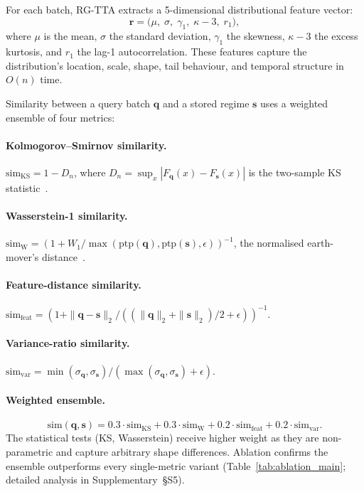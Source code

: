 \documentclass[journal]{IEEEtran}
\begin{document}
For each batch, RG-TTA extracts a 5-dimensional distributional feature vector:
\begin{equation}
  \mathbf{r} = \big(\mu,\; \sigma,\; \gamma_1,\; \kappa{-}3,\; r_1\big),
  \label{eq:features}
\end{equation}
where $\mu$ is the mean, $\sigma$ the standard deviation, $\gamma_1$ the skewness, $\kappa{-}3$ the excess kurtosis, and $r_1$ the lag-1 autocorrelation. These features capture the distribution's location, scale, shape, tail behaviour, and temporal structure in $O(n)$ time.

Similarity between a query batch $\mathbf{q}$ and a stored regime $\mathbf{s}$ uses a weighted ensemble of four metrics:

\paragraph{Kolmogorov--Smirnov similarity.} $\text{sim}_{\text{KS}} = 1 - D_n$, where $D_n = \sup_x |F_{\mathbf{q}}(x) - F_{\mathbf{s}}(x)|$ is the two-sample KS statistic~\cite{massey1951ks}.

\paragraph{Wasserstein-1 similarity.} $\text{sim}_{\text{W}} = (1 + W_1 / \max(\text{ptp}(\mathbf{q}), \text{ptp}(\mathbf{s}), \epsilon))^{-1}$, the normalised earth-mover's distance~\cite{villani2009optimal}.

\paragraph{Feature-distance similarity.} $\text{sim}_{\text{feat}} = (1 + \|\mathbf{q} - \mathbf{s}\|_2 / ((\|\mathbf{q}\|_2 + \|\mathbf{s}\|_2)/2 + \epsilon))^{-1}$.

\paragraph{Variance-ratio similarity.} $\text{sim}_{\text{var}} = \min(\sigma_{\mathbf{q}}, \sigma_{\mathbf{s}}) / (\max(\sigma_{\mathbf{q}}, \sigma_{\mathbf{s}}) + \epsilon)$.

\paragraph{Weighted ensemble.}
\begin{equation}
  \text{sim}(\mathbf{q}, \mathbf{s}) = 0.3 \cdot \text{sim}_{\text{KS}} + 0.3 \cdot \text{sim}_{\text{W}} + 0.2 \cdot \text{sim}_{\text{feat}} + 0.2 \cdot \text{sim}_{\text{var}}.
  \label{eq:ensemble}
\end{equation}
The statistical tests (KS, Wasserstein) receive higher weight as they are non-parametric and capture arbitrary shape differences. Ablation confirms the ensemble outperforms every single-metric variant (Table~\ref{tab:ablation_main}; detailed analysis in Supplementary~\S{S5}).
\end{document}
